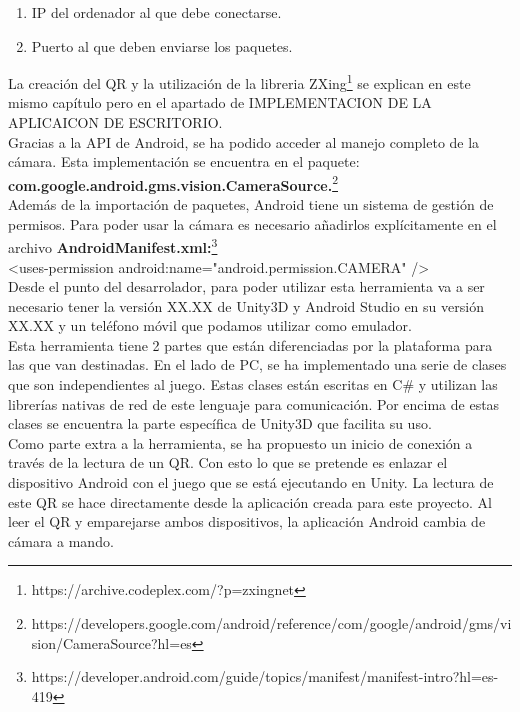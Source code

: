 \begin{enumerate}

\item IP del ordenador al que debe conectarse.
\item Puerto al que deben enviarse los paquetes.

\end{enumerate}

La creaci\'on del QR y la utilizaci\'on de la libreria ZXing\footnote{https://archive.codeplex.com/?p=zxingnet} se explican en este mismo cap\'itulo pero en el apartado de  IMPLEMENTACION DE LA APLICAICON DE ESCRITORIO.
\\
Gracias a la API de Android, se ha podido acceder al manejo completo de la c\'amara. Esta implementaci\'on se encuentra en el paquete:\\ \textbf{com.google.android.gms.vision.CameraSource.}\footnote{https://developers.google.com/android/reference/com/google/android/gms/vision/CameraSource?hl=es}
\\
Adem\'as de la importaci\'on de paquetes, Android tiene un sistema de gesti\'on de permisos. Para poder usar la c\'amara es necesario a\~nadirlos expl\'icitamente en el archivo \textbf{AndroidManifest.xml:}\footnote{https://developer.android.com/guide/topics/manifest/manifest-intro?hl=es-419}
\\    <uses-permission android:name="android.permission.CAMERA" />\\


Desde el punto del desarrolador, para poder utilizar esta herramienta va a ser necesario tener la versi\'on XX.XX de Unity3D y Android Studio en su versi\'on XX.XX y un tel\'efono m\'ovil que podamos utilizar como emulador.
\\
Esta herramienta tiene 2 partes que est\'an diferenciadas por la plataforma para las que van destinadas. En el lado de PC, se ha implementado una serie de clases que son independientes al juego. 
Estas clases est\'an escritas en C\# y utilizan las librer\'ias  nativas de red de este lenguaje para comunicaci\'on. Por encima de estas clases se encuentra la parte espec\'ifica de Unity3D que facilita su uso. 
\\
Como parte extra a la herramienta, se ha propuesto un inicio de conexi\'on a trav\'es de la lectura de un QR. Con esto lo que se pretende es enlazar el dispositivo Android con el juego que se est\'a ejecutando en Unity. 
La lectura de este QR se hace directamente desde la aplicaci\'on creada para este proyecto. Al leer el QR y emparejarse ambos dispositivos, la aplicaci\'on Android cambia de c\'amara a mando.
\\

